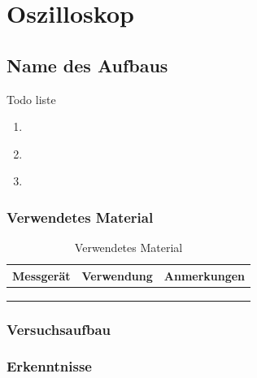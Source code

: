 \section{Oszilloskop}\label{sec:2}
\subsection{Name des Aufbaus}\label{sec:2-1}

\begin{highlightblock}
	Todo liste
	\begin{enumerate}[label=\textbf{\alph*:}, ref=\alph*]
		\item\label{itm:2-P1-1}
		\item\label{itm:2-P1-2}
		\item\label{itm:2-P1-3}
	\end{enumerate}
	
\end{highlightblock}

\subsubsection{Verwendetes Material}

\begin{table}[h]
	\centering
	\caption{Verwendetes Material}
	\begin{tabularx}{\textwidth}{XXX}
		\textbf{Messgerät} & \textbf{Verwendung} & \textbf{Anmerkungen}\\ \midrule
		&  &  \\
		&  &  \\
		&  &  \\
	\end{tabularx}	
\end{table}

\subsubsection{Versuchsaufbau}

\marginref{\ref{itm:2-P1-1}}
\marginref{\ref{itm:2-P1-2}}
\marginref{\ref{itm:2-P1-3}}

\subsubsection{Erkenntnisse}